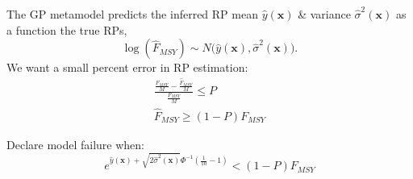 \documentclass[a0paper,portrait]{baposter}
\begin{document}
\begin{poster}
{\begin{minipage}[h!]{0.74\textwidth}
        \end{minipage}
        \begin{minipage}[h!]{0.26\textwidth}
	
	The GP metamodel predicts the inferred RP mean $\hat y(\textbf{x})$ \& variance $\hat \sigma^2(\textbf{x})$ as a function the true RPs, %
        \begin{equation*}
        \log(\hat{F}_{MSY}) \sim N\Big(\hat y(\textbf{x}), \hat \sigma^2(\textbf{x})\Big).
        \end{equation*}
        We want a small percent error in RP estimation:
        \begin{align*}
        \frac{\frac{F_{MSY}}{M}-\frac{\hat{F}_{MSY}}{M}}{\frac{F_{MSY}}{M}}\le P\\
        \hat{F}_{MSY}\ge(1-P)F_{MSY}
        \end{align*}

        Declare model failure when:
        \begin{equation*}
        e^{\hat y(\textbf{x}) + \sqrt{2\hat \sigma^2(\textbf{x})}\Phi^{-1}\left(\frac{1}{10}-1\right)}<(1-P)F_{MSY} 
        \end{equation*}
        \end{minipage}
}


\end{poster}
\end{document}
